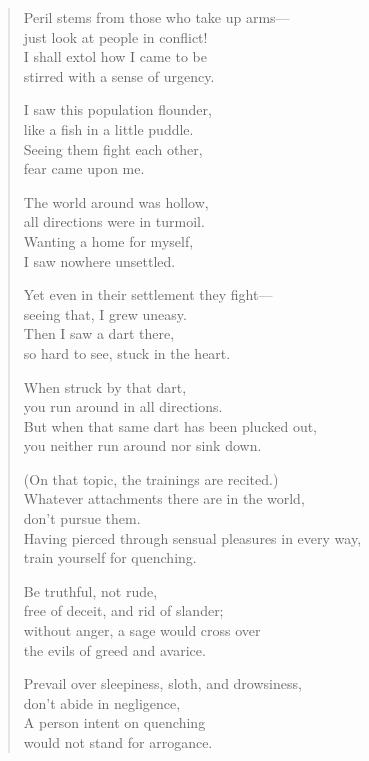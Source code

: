 \documentclass[12pt,openany]{book}%
\begin{document}
\begin{verse}%
Peril stems from those who take up arms—\\
just look at people in conflict! \\
I shall extol how I came to be \\
stirred with a sense of urgency. 

I saw this population flounder, \\
like a fish in a little puddle. \\
Seeing them fight each other, \\
fear came upon me. 

The world around was hollow, \\
all directions were in turmoil. \\
Wanting a home for myself, \\
I saw nowhere unsettled. 

Yet even in their settlement they fight— \\
seeing that, I grew uneasy. \\
Then I saw a dart there, \\
so hard to see, stuck in the heart. 

When struck by that dart, \\
you run around in all directions. \\
But when that same dart has been plucked out, \\
you neither run around nor sink down. 

(On that topic, the trainings are recited.) \\
Whatever attachments there are in the world, \\
don’t pursue them. \\
Having pierced through sensual pleasures in every way, \\
train yourself for quenching. 

Be truthful, not rude, \\
free of deceit, and rid of slander; \\
without anger, a sage would cross over \\
the evils of greed and avarice. 

Prevail over sleepiness, sloth, and drowsiness, \\
don’t abide in negligence, \\
A person intent on quenching \\
would not stand for arrogance. 


\end{verse}
\end{document}
